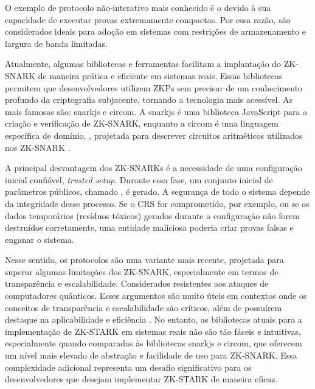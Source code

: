 O exemplo de protocolo não-interativo mais conhecido é o  \cite{Farias2024ZKP} devido à sua capacidade de executar provas extremamente compactas. Por essa razão, são considerados ideais para adoção em sistemas com restrições de armazenamento e largura de banda limitadas.

Atualmente, algumas bibliotecas e ferramentas facilitam a implantação do \acs{ZK-SNARK} de maneira prática e eficiente em sistemas reais. Essas bibliotecas permitem que desenvolvedores utilizem \acs{ZKP}s sem precisar de um conhecimento profundo da criptografia subjacente, tornando a tecnologia mais acessível. As mais famosas são: snarkjs e circom. A snarkjs é uma biblioteca JavaScript para a criação e verificação de \acs{ZK-SNARK}, enquanto a circom é uma linguagem específica de domínio, , projetada para descrever circuitos aritméticos utilizados nos \acs{ZK-SNARK} \cite{belles2023circom}. 

A principal desvantagem dos ZK-SNARKs é a necessidade de uma configuração inicial confiável, \textit{trusted setup}. Durante essa fase, um conjunto inicial de parâmetros públicos, chamado , é gerado. A segurança de todo o sistema depende da integridade desse processo. Se o \acs{CRS} for comprometido, por exemplo, ou se os dados temporários (resíduos tóxicos) gerados durante a configuração não forem destruídos corretamente, uma entidade maliciosa poderia criar provas falsas e enganar o sistema.

Nesse sentido, os protocolos   são uma variante mais recente, projetada para superar algumas limitações dos \acs{ZK-SNARK}, especialmente em termos de transparência e escalabilidade. Considerados resistentes aos ataques de computadores quânticos. Esses argumentos são muito úteis em contextos onde os conceitos de transparência e escalabilidade são críticos, além de possuírem destaque na aplicabilidade e eficiência \cite{Farias2024ZKP}. No entanto, as bibliotecas atuais para a implementação de \acs{ZK-STARK} em sistemas reais não são tão fáceis e intuitivas, especialmente quando comparadas às bibliotecas snarkjs e circom, que oferecem um nível mais elevado de abstração e facilidade de uso para \acs{ZK-SNARK}. Essa complexidade adicional  representa um desafio significativo para os desenvolvedores que desejam implementar \acs{ZK-STARK} de maneira eficaz.

